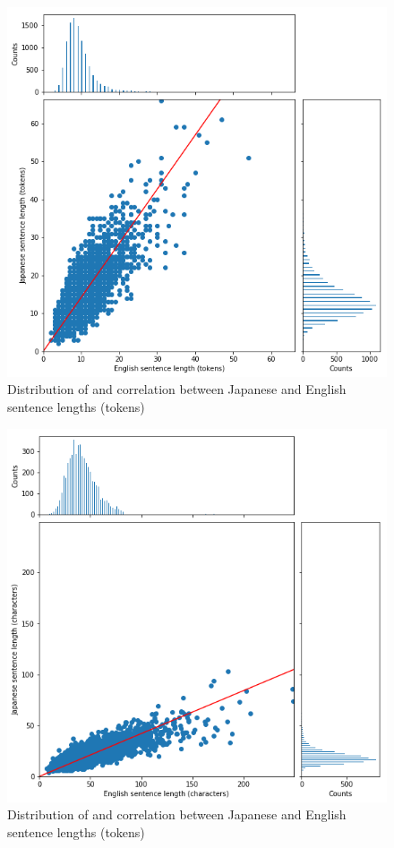\documentclass[answers]{exam}
\begin{document}
\begin{CJK}{UTF8}{min}
\begin{figure}
  \centering
  \includegraphics[width=\linewidth]{fig-corr-toks}
  \caption[Sentence lenths (tokens)]%
  {Distribution of and correlation between Japanese and English sentence lengths (tokens)}
  \label{fig:corr-toks}
\end{figure}

\begin{figure}
  \centering
  \includegraphics[width=\linewidth]{fig-corr-chars}
  \caption[Sentence lenths (characters)]%
  {Distribution of and correlation between Japanese and English sentence lengths (tokens)}
  \label{fig:corr-chars}
\end{figure}


\end{CJK}
\end{document}
